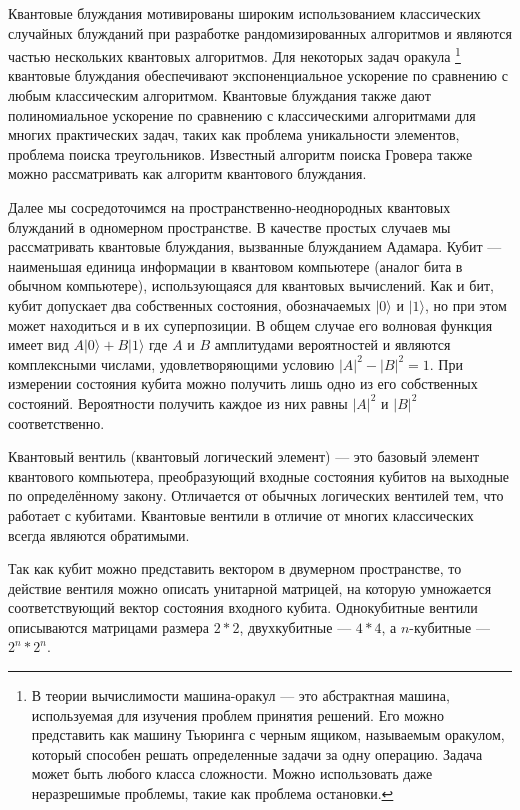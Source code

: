 \documentclass[a4paper]{report}
\begin{document}
Квантовые блуждания мотивированы широким использованием классических случайных блужданий при разработке рандомизированных алгоритмов и являются частью нескольких квантовых алгоритмов. Для некоторых задач оракула
\footnote{
В теории вычислимости машина-оракул — это абстрактная машина, используемая для изучения проблем принятия решений. Его можно представить как машину Тьюринга с черным ящиком, называемым оракулом, который способен решать определенные задачи за одну операцию. Задача может быть любого класса сложности. Можно использовать даже неразрешимые проблемы, такие как проблема остановки.}
квантовые блуждания обеспечивают экспоненциальное ускорение по сравнению с любым классическим алгоритмом. Квантовые блуждания также дают полиномиальное ускорение по сравнению с классическими алгоритмами для многих практических задач, таких как проблема уникальности элементов, проблема поиска треугольников. Известный алгоритм поиска Гровера также можно рассматривать как алгоритм квантового блуждания.

Далее  мы сосредоточимся на пространственно-неоднородных квантовых блужданий в одномерном пространстве. В качестве простых случаев мы рассматривать квантовые блуждания, вызванные блужданием Адамара.
Кубит — наименьшая единица информации в квантовом компьютере (аналог бита в обычном компьютере), использующаяся для квантовых вычислений.
Как и бит, кубит допускает два собственных состояния, обозначаемых $|0\rangle$ и $|1\rangle$, но при этом может находиться и в их суперпозиции. В общем случае его волновая функция имеет вид $A|0\rangle + B|1\rangle$ где $A$ и $B$ амплитудами вероятностей и являются комплексными числами, удовлетворяющими условию $|A|^{2} - |B|^{2} = 1$.
При измерении состояния кубита можно получить лишь одно из его собственных состояний. Вероятности получить каждое из них равны  $|A|^{2}$ и $|B|^{2}$ соответственно.

Квантовый вентиль (квантовый логический элемент) — это базовый элемент квантового компьютера, преобразующий входные состояния кубитов на выходные по определённому закону. Отличается от обычных логических вентилей тем, что работает с кубитами. Квантовые вентили в отличие от многих классических всегда являются обратимыми.

Так как кубит можно представить вектором в двумерном пространстве, то действие вентиля можно описать унитарной матрицей, на которую умножается соответствующий вектор состояния входного кубита. Однокубитные вентили описываются матрицами размера $2 \ast 2$,
двухкубитные — $4 \ast 4$, а $n$-кубитные — $2^{n} \ast 2^{n}$.
\end{document}

